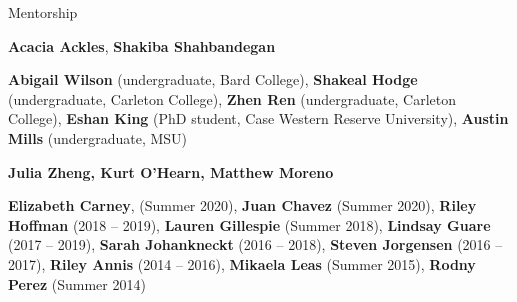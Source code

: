 \begin{rubric}{Mentorship}

 \textbf{Acacia Ackles}, \textbf{Shakiba Shahbandegan}

 \textbf{Abigail Wilson} (undergraduate, Bard College), \textbf{Shakeal Hodge} (undergraduate, Carleton College), \textbf{Zhen Ren} (undergraduate, Carleton College), \textbf{Eshan King} (PhD student, Case Western Reserve University), \textbf{Austin Mills} (undergraduate, MSU)

 \textbf{Julia Zheng, Kurt O'Hearn, Matthew Moreno}

 \textbf{Elizabeth Carney}, (Summer 2020), \textbf{Juan Chavez} (Summer 2020), \textbf{Riley Hoffman} (2018 -- 2019), \textbf{Lauren Gillespie} (Summer 2018), \textbf{Lindsay Guare} (2017 -- 2019), \textbf{Sarah Johankneckt} (2016 -- 2018), \textbf{Steven Jorgensen} (2016 -- 2017), \textbf{Riley Annis} (2014 -- 2016), \textbf{Mikaela Leas} (Summer 2015), \textbf{Rodny Perez} (Summer 2014)

\end{rubric}